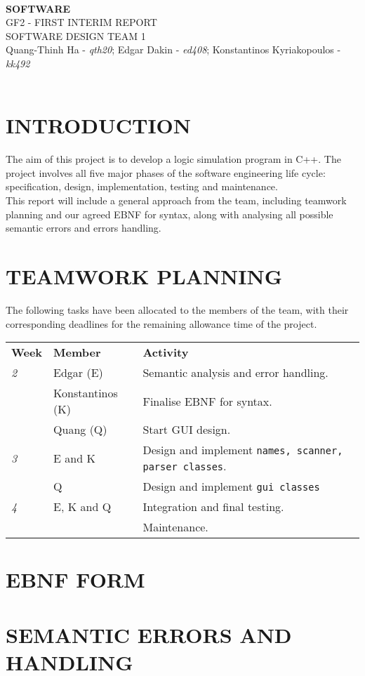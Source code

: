 \documentclass[a4paper, 11pt]{article}
\begin{document}
\Large
\begin{center}
\hrulefill \\
\textbf{SOFTWARE} \\
GF2 - FIRST INTERIM REPORT \\
\vspace{0.2cm}
\normalsize 
SOFTWARE DESIGN TEAM 1 \\
Quang-Thinh Ha - \textit{qth20}; Edgar Dakin - \textit{ed408}; Konstantinos Kyriakopoulos - \textit{kk492} \\
\hrulefill \\
\end{center}

\normalsize

\section{INTRODUCTION}
The aim of this project is to develop a logic simulation program in C++. The project involves all five major phases of the software engineering life cycle: specification, design, implementation, testing and maintenance. \\
\noindent
This report will include a general approach from the team, including teamwork planning and our agreed EBNF for syntax, along with analysing all possible semantic errors and errors handling.

\section{TEAMWORK PLANNING}
The following tasks have been allocated to the members of the team, with their corresponding deadlines for the remaining allowance time of the project. 

\begin{center}
\begin{tabular}{l l l}
\textbf{Week} & \textbf{Member} &  \textbf{Activity} \\
\textit{2} & Edgar (E) & Semantic analysis and error handling. \\
{} &  Konstantinos (K) & Finalise EBNF for syntax. \\
{} & Quang (Q) & Start GUI design. \\
\textit{3} & E and K & Design and implement \texttt{names, scanner, parser classes}.\\
{} & Q & Design and implement \texttt{gui classes}\\
\textit{4} & E, K and Q & Integration and final testing. \\
{} & {} & Maintenance. \\
\end{tabular} 
\end{center}

\section{EBNF FORM}

\section{SEMANTIC ERRORS AND HANDLING}
\end{document}
